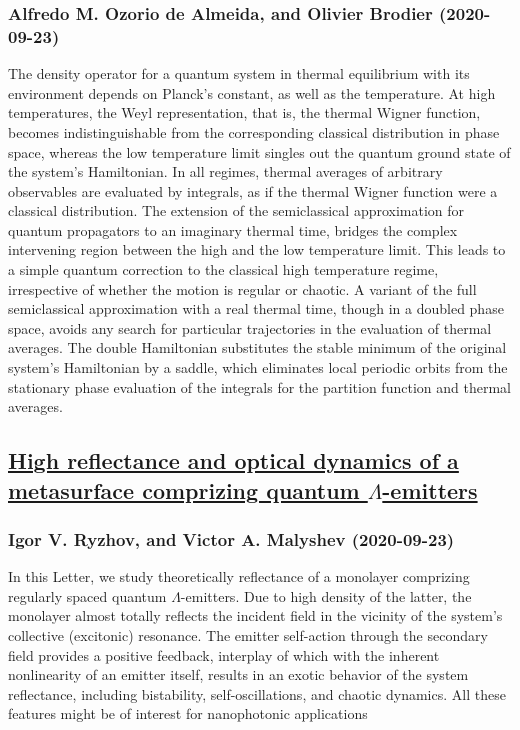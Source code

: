 \subsubsection*{Alfredo M. Ozorio de Almeida, and Olivier Brodier (2020-09-23)}
The density operator for a quantum system in thermal equilibrium with its
environment depends on Planck's constant, as well as the temperature. At high
temperatures, the Weyl representation, that is, the thermal Wigner function,
becomes indistinguishable from the corresponding classical distribution in
phase space, whereas the low temperature limit singles out the quantum ground
state of the system's Hamiltonian. In all regimes, thermal averages of
arbitrary observables are evaluated by integrals, as if the thermal Wigner
function were a classical distribution.
  The extension of the semiclassical approximation for quantum propagators to
an imaginary thermal time, bridges the complex intervening region between the
high and the low temperature limit. This leads to a simple quantum correction
to the classical high temperature regime, irrespective of whether the motion is
regular or chaotic. A variant of the full semiclassical approximation with a
real thermal time, though in a doubled phase space, avoids any search for
particular trajectories in the evaluation of thermal averages. The double
Hamiltonian substitutes the stable minimum of the original system's Hamiltonian
by a saddle, which eliminates local periodic orbits from the stationary phase
evaluation of the integrals for the partition function and thermal averages.

\subsection*{\href{http://arxiv.org/abs/2009.11664v1}{High reflectance and optical dynamics of a metasurface comprizing  quantum $Λ$-emitters}}
\subsubsection*{Igor V. Ryzhov, and Victor A. Malyshev (2020-09-23)}
In this Letter, we study theoretically reflectance of a monolayer comprizing
regularly spaced quantum $\Lambda$-emitters. Due to high density of the latter,
the monolayer almost totally reflects the incident field in the vicinity of the
system's collective (excitonic) resonance. The emitter self-action through the
secondary field provides a positive feedback, interplay of which with the
inherent nonlinearity of an emitter itself, results in an exotic behavior of
the system reflectance, including bistability, self-oscillations, and chaotic
dynamics. All these features might be of interest for nanophotonic applications

